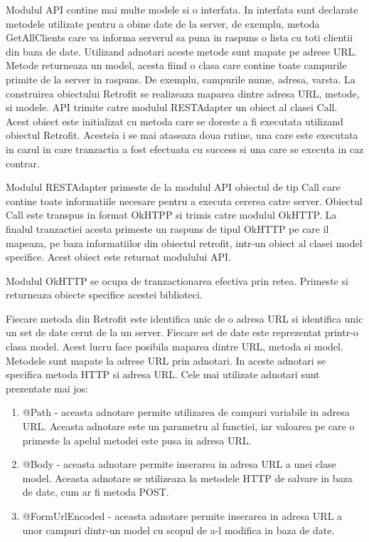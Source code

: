Modulul API contine mai multe modele si o interfata. In interfata sunt declarate metodele utilizate pentru a obine date de la server, de exemplu, metoda 
GetAllClients care va informa serverul sa puna in raspuns o lista cu toti clientii din baza de date. Utilizand adnotari aceste metode sunt mapate pe adrese URL. 
Metode returneaza un model, acesta fiind o clasa care contine toate campurile primite de la server in raspuns. De exemplu, campurile nume, adresa, 
varsta. La construirea obiectului Retrofit se realizeaza maparea dintre adresa URL, metode, si modele. API trimite catre modulul RESTAdapter un obiect 
al clasei Call. Acest obiect este initializat cu metoda care se doreste a fi executata utilizand obiectul Retrofit. Acesteia i se mai ataseaza 
doua rutine, una care este executata in cazul in care tranzactia a fost efectuata cu success si una care se executa in caz 
contrar.

Modulul RESTAdapter primeste de la modulul API obiectul de tip Call care contine toate informatiile necesare pentru a executa cererea catre server. Obiectul Call 
este transpus in format OkHTPP si trimis catre modulul OkHTTP. La finalul tranzactiei acesta primeste un raspuns de tipul OkHTTP pe care il mapeaza, 
pe baza informatiilor din obiectul retrofit, intr-un obiect al clasei model specifice. Acest obiect este returnat modulului API.

Modulul OkHTTP se ocupa de tranzactionarea efectiva prin retea. Primeste si returneaza obiecte specifice acestei biblioteci.

Fiecare metoda din Retrofit este identifica unic de o adresa URL si identifica unic un set de date cerut de la un server. Fiecare set de date este 
reprezentat printr-o clasa model. Acest lucru face posibila maparea dintre URL, metoda si model. Metodele sunt mapate la adrese URL prin adnotari. 
In aceste adnotari se specifica metoda HTTP si adresa URL. Cele mai utilizate adnotari sunt prezentate mai jos:
\begin{enumerate}
	\item @Path - aceasta adnotare permite utilizarea de campuri variabile in adresa URL. Aceasta adnotare este un parametru al functiei, iar valoarea 
	pe care o primeste la apelul metodei este pusa in adresa URL.
    \item @Body - aceasta adnotare permite inserarea in adresa URL a unei clase model. Aceasta adnotare se utilizeaza la metodele HTTP de salvare 
    in baza de date, cum ar fi metoda POST.
    \item @FormUrlEncoded - aceasta adnotare permite inserarea in adresa URL a unor campuri dintr-un model cu scopul de a-l modifica in baza de date.
\end{enumerate}

